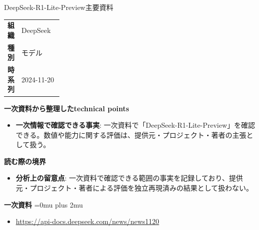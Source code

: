 \begin{technicalnote}{DeepSeek-R1-Lite-Preview}{主要資料}
\begingroup
\begin{tabularx}{\linewidth}{@{}>{\bfseries}p{0.22\linewidth}X@{}}
組織 & DeepSeek \\
種別 & モデル \\
時系列 & 2024-11-20 \\
\end{tabularx}
\smallskip
{\bfseries 一次資料から整理したtechnical points}
\begin{itemize}[leftmargin=1.5em,itemsep=0.35em]
\item \textbf{一次情報で確認できる事実}: 一次資料で「DeepSeek-R1-Lite-Preview」を確認できる。数値や能力に関する評価は、提供元・プロジェクト・著者の主張として扱う。
\end{itemize}
\begin{minipage}{\linewidth}
{\bfseries 読む際の境界}
\begin{itemize}[leftmargin=1.5em,itemsep=0.35em]
\item \textbf{分析上の留意点}: 一次資料で確認できる範囲の事実を記録しており、提供元・プロジェクト・著者による評価を独立再現済みの結果として扱わない。
\end{itemize}
\begin{samepage}
{\bfseries 一次資料}
\begingroup\sloppy
\Urlmuskip=0mu plus 2mu\relax
\begin{itemize}[leftmargin=1.5em,itemsep=0.25em]
\item {\scriptsize\url{https://api-docs.deepseek.com/news/news1120}}
\end{itemize}
\endgroup
\end{samepage}
\end{minipage}
\endgroup
\end{technicalnote}
\medskip

